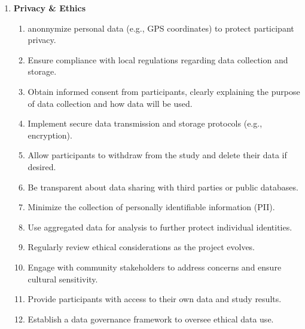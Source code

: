 \documentclass[12pt,a4paper]{article}
\begin{document}
\begin{enumerate}
    \item \textbf{Privacy \& Ethics}
          \begin{enumerate}
              \item anonnymize personal data (e.g., GPS coordinates) to protect participant privacy.
              \item Ensure compliance with local regulations regarding data collection and storage.
              \item Obtain informed consent from participants, clearly explaining the purpose of data collection and how data will be used.
              \item Implement secure data transmission and storage protocols (e.g., encryption).
              \item Allow participants to withdraw from the study and delete their data if desired.
              \item Be transparent about data sharing with third parties or public databases.
              \item Minimize the collection of personally identifiable information (PII).
              \item Use aggregated data for analysis to further protect individual identities.
              \item Regularly review ethical considerations as the project evolves.
              \item Engage with community stakeholders to address concerns and ensure cultural sensitivity.
              \item Provide participants with access to their own data and study results.
              \item Establish a data governance framework to oversee ethical data use.
          \end{enumerate}


\end{enumerate}
\end{document}
